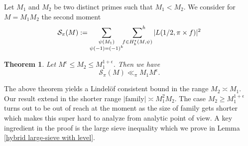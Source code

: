 \documentclass[12pt,a4paper,twoside, reqno]{amsart}
\newtheorem{theorem}{Theorem}
\begin{document}
Let $M_1$ and $M_2$ be two distinct primes such that  $M_1 <M_2$. 
We consider for $M=M_1M_2$ the second moment
\[ \mathcal{S}_\pi(M):= \mathop{ \sum_{\substack{\psi(M_1) \\ \psi(-1)=(-1)^k }}} \sideset{}{^h}\sum_{f \in H_k^{\star}(M,\psi)} |L(1/2, \pi \times f)|^2\]
\begin{theorem}\label{main thm}
   Let $M^\epsilon \leq M_2 \leq M_1^{1+\epsilon}$.  
   Then  we have 
   \[ \mathcal{S}_\pi(M) \ll_\pi M_1M^\epsilon .\]
\end{theorem}

 The above theorem yields a Lindel\"of consistent bound in the range $ M_2 \asymp M_1$.  Our result extend \cite{D11}  in  the shorter range $ |\mathrm{family}| \asymp M_1^2M_2$. The case $M_2 \geq M_1^{1+\epsilon}$ turns out to be out of reach at the moment as the size of family gets shorter which makes this super hard to analyze from analytic point of view. A key ingredient in the proof is the large sieve inequality which we prove in Lemma \ref{hybrid large-sieve with level}.
\end{document}
